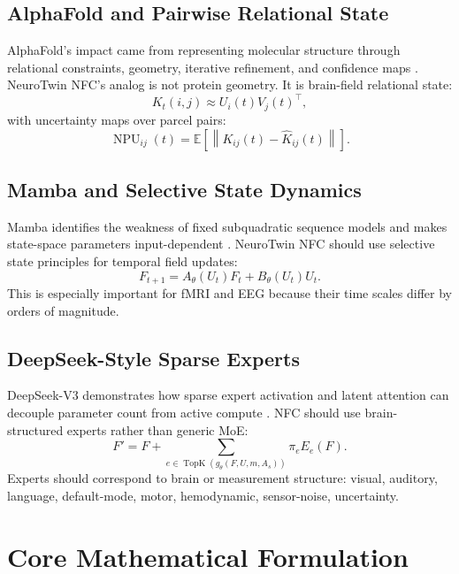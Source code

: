 \documentclass[11pt]{article}
\newcommand{\E}{\mathbb{E}}
\begin{document}
\subsection{AlphaFold and Pairwise Relational State}

AlphaFold's impact came from representing molecular structure through relational constraints, geometry, iterative refinement, and confidence maps \cite{alphafold2,alphafold3}. NeuroTwin NFC's analog is not protein geometry. It is brain-field relational state:
\begin{equation}
K_t(i,j) \approx U_i(t)V_j(t)^\top,
\end{equation}
with uncertainty maps over parcel pairs:
\begin{equation}
\operatorname{NPU}_{ij}(t)=\E\left[\left\|K_{ij}(t)-\hat{K}_{ij}(t)\right\|\right].
\end{equation}

\subsection{Mamba and Selective State Dynamics}

Mamba identifies the weakness of fixed subquadratic sequence models and makes state-space parameters input-dependent \cite{mamba}. NeuroTwin NFC should use selective state principles for temporal field updates:
\begin{equation}
F_{t+1}=A_\theta(U_t)F_t + B_\theta(U_t)U_t.
\end{equation}
This is especially important for fMRI and EEG because their time scales differ by orders of magnitude.

\subsection{DeepSeek-Style Sparse Experts}

DeepSeek-V3 demonstrates how sparse expert activation and latent attention can decouple parameter count from active compute \cite{deepseekv3}. NFC should use brain-structured experts rather than generic MoE:
\begin{equation}
F' = F + \sum_{e\in \operatorname{TopK}(g_\theta(F,U,m,A_s))} \pi_e E_e(F).
\end{equation}
Experts should correspond to brain or measurement structure: visual, auditory, language, default-mode, motor, hemodynamic, sensor-noise, uncertainty.

\section{Core Mathematical Formulation}
\end{document}
